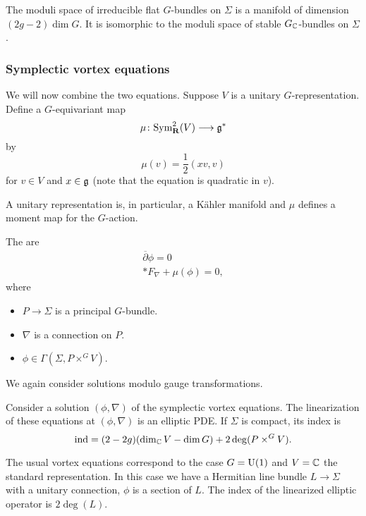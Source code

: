 \begin{thm}
The moduli space of irreducible flat $G$-bundles on $\Sigma$ is a manifold of dimension $(2g-2)\dim G$. It is isomorphic to the moduli space of stable $G_{\mathbb{C}}$-bundles on $\Sigma$.
\end{thm}

\subsubsection{Symplectic vortex equations}

We will now combine the two equations. Suppose $V$ is a unitary $G$-representation. Define a $G$-equivariant map
\[\mu\colon \mathrm{Sym}^2_{\mathbf{R}}(V)\longrightarrow \mathfrak{g}^*\]
by
\[\mu(v) = \frac{1}{2}(xv, v)\]
for $v\in V$ and $x\in\mathfrak{g}$ (note that the equation is quadratic in $v$).

\begin{remark}
A unitary representation is, in particular, a K\"ahler manifold and $\mu$ defines a moment map for the $G$-action.
\end{remark}

\begin{defn}
The  are
\begin{eqnarray*}
\overline{\partial} \phi = 0 \\
\ast F_\nabla + \mu(\phi) = 0,
\end{eqnarray*}
where
\begin{itemize}
\item $P\rightarrow \Sigma$ is a principal $G$-bundle.
\item $\nabla$ is a connection on $P$.
\item $\phi\in\Gamma(\Sigma, P\times^G V)$.
\end{itemize}
We again consider solutions modulo gauge transformations.
\end{defn}

\begin{prop}
Consider a solution $(\phi, \nabla)$ of the symplectic vortex equations. The linearization of these equations at $(\phi, \nabla)$ is an elliptic PDE. If $\Sigma$ is compact, its index is
\[\mathrm{ind} = (2-2g)(\dim_{\mathbb{C}} V - \dim G) + 2\deg(P\times^G V).\]
\end{prop}

\begin{example}
The usual vortex equations correspond to the case $G=\mathrm{U}(1)$ and $V=\mathbb{C}$ the standard representation. In this case we have a Hermitian line bundle $L\rightarrow \Sigma$ with a unitary connection, $\phi$ is a section of $L$. The index of the linearized elliptic operator is $2\deg(L)$.
\end{example}

